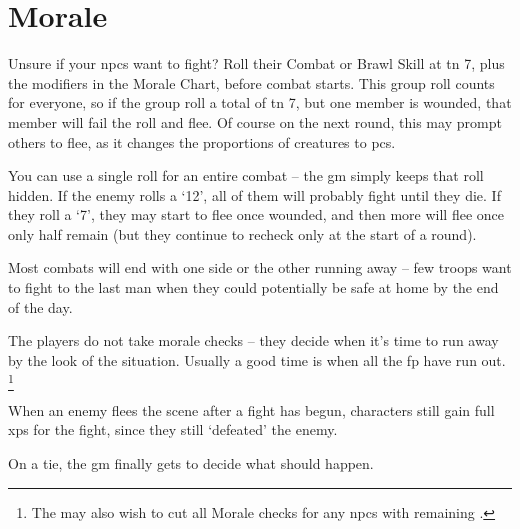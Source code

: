 \section{Morale}
\label{morale}
\begin{multicols}{2}

\noindent
Unsure if your \glspl{npc} want to fight?
Roll their Combat or Brawl Skill at \gls{tn} 7, plus the modifiers in the Morale Chart, before combat starts.
This group roll counts for everyone, so if the group roll a total of \gls{tn} 7, but one member is wounded, that member will fail the roll and flee.
Of course on the next round, this may prompt others to flee, as it changes the proportions of creatures to \glspl{pc}.

You can use a single roll for an entire combat -- the \gls{gm} simply keeps that roll hidden.
If the enemy rolls a `12', all of them will probably fight until they die.
If they roll a `7', they may start to flee once wounded, and then more will flee once only half remain (but they continue to recheck only at the start of a round).

Most combats will end with one side or the other running away -- few troops want to fight to the last man when they could potentially be safe at home by the end of the day.

The players do not take morale checks -- they decide when it's time to run away by the look of the situation.
Usually a good time is when all the \gls{fp} have run out.
\footnote{The  may also wish to cut all Morale checks for any \glspl{npc} with remaining .}

When an enemy flees the scene after a fight has begun, characters still gain full \glspl{xp} for the fight, since they still `defeated' the enemy.

On a tie, the \gls{gm} finally gets to decide what should happen.

\end{multicols}

\moralechart

